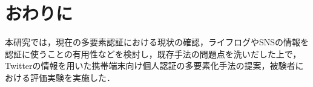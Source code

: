 \documentclass[twocolumn, a4paper, 9pt]{UECIEresume}
\begin{document}
\section{おわりに}\label{finish}
本研究では，現在の多要素認証における現状の確認，ライフログやSNSの情報を認証に使うことの有用性などを検討し，既存手法の問題点を洗いだした上で，Twitterの情報を用いた携帯端末向け個人認証の多要素化手法の提案，被験者における評価実験を実施した．



\end{document}

